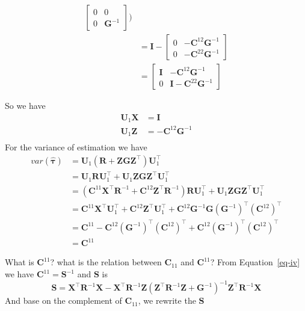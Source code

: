 \documentclass[
  a4paper,
  oneside,
  openany,
  12pt,
  onecolumn]{book}
\theoremstyle{plain}
\theoremstyle{definition}
\theoremstyle{remark}
\begin{document}
\[\begin{aligned}
\begin{bmatrix}
0 & 0 \\
0 & \boldsymbol{G}^{-1}
\end{bmatrix})\\
&=
\boldsymbol{I}-
\begin{bmatrix}
0 & -\boldsymbol{C}^{12}\boldsymbol{G}^{-1} \\
0 & -\boldsymbol{C}^{22}\boldsymbol{G}^{-1}
\end{bmatrix}\\
&=
\begin{bmatrix}
\boldsymbol{I} & -\boldsymbol{C}^{12}\boldsymbol{G}^{-1} \\
0 & \boldsymbol{I}-\boldsymbol{C}^{22}\boldsymbol{G}^{-1}
\end{bmatrix}
\end{aligned}\]

So we have \[\begin{aligned}
\boldsymbol{U}_1\boldsymbol{X}&=\boldsymbol{I}\\
\boldsymbol{U}_1\boldsymbol{Z}&=-\boldsymbol{C}^{12}\boldsymbol{G}^{-1}\\
\end{aligned}\] For the variance of estimation we have \[\begin{aligned}
var(\hat{\boldsymbol{\tau}})
&=
\boldsymbol{U}_1(\boldsymbol{R}+\boldsymbol{ZGZ}^\top)\boldsymbol{U}_1^\top\\
&= \boldsymbol{U}_1\boldsymbol{R}\boldsymbol{U}_1^\top+\boldsymbol{U}_1\boldsymbol{ZGZ}^\top\boldsymbol{U}_1^\top\\
&= (\boldsymbol{C}^{11}\boldsymbol{X}^\top\boldsymbol{R}^{-1}+\boldsymbol{C}^{12}\boldsymbol{Z}^\top\boldsymbol{R}^{-1})\boldsymbol{R}\boldsymbol{U}_1^\top+\boldsymbol{U}_1\boldsymbol{ZGZ}^\top\boldsymbol{U}_1^\top\\
&=\boldsymbol{C}^{11}\boldsymbol{X}^\top\boldsymbol{U}_1^\top+\boldsymbol{C}^{12}\boldsymbol{Z}^\top\boldsymbol{U}_1^\top+\boldsymbol{C}^{12}\boldsymbol{G}^{-1}\boldsymbol{G}(\boldsymbol{G}^{-1})^\top(\boldsymbol{C}^{12})^\top\\
&=\boldsymbol{C}^{11}-\boldsymbol{C}^{12}(\boldsymbol{G}^{-1})^\top(\boldsymbol{C}^{12})^\top+\boldsymbol{C}^{12}(\boldsymbol{G}^{-1})^\top(\boldsymbol{C}^{12})^\top\\
&=\boldsymbol{C}^{11}
\end{aligned}\]

What is \(\boldsymbol{C}^{11}\)? what is the relation between
\(\boldsymbol{C}_{11}\) and \(\boldsymbol{C}^{11}\)? From
Equation~\ref{eq-iv} we have \(\boldsymbol{C}^{11}=\boldsymbol{S}^{-1}\)
and \(\boldsymbol{S}\) is \[
\boldsymbol{S} = \boldsymbol{X}^\top \boldsymbol{R}^{-1} \boldsymbol{X} - \boldsymbol{X}^\top \boldsymbol{R}^{-1} \boldsymbol{Z} (\boldsymbol{Z}^\top \boldsymbol{R}^{-1} \boldsymbol{Z} + \boldsymbol{G}^{-1})^{-1} \boldsymbol{Z}^\top \boldsymbol{R}^{-1} \boldsymbol{X}
\] And base on the complement of \(\boldsymbol{C}_{11}\), we rewrite the
\(\boldsymbol{S}\) \[
\]
\end{document}
